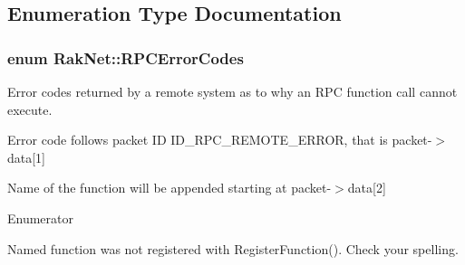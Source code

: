 \subsection{Enumeration Type Documentation}
\hypertarget{group___r_p_c___p_l_u_g_i_n___g_r_o_u_p_gac20c52e6dc585406689d52db29925bba}{
\subsubsection[{R\-P\-C\-Error\-Codes}]{\setlength{\rightskip}{0pt plus 5cm}enum {\bf Rak\-Net\-::\-R\-P\-C\-Error\-Codes}}}\label{group___r_p_c___p_l_u_g_i_n___g_r_o_u_p_gac20c52e6dc585406689d52db29925bba}


Error codes returned by a remote system as to why an R\-P\-C function call cannot execute. 

Error code follows packet I\-D I\-D\-\_\-\-R\-P\-C\-\_\-\-R\-E\-M\-O\-T\-E\-\_\-\-E\-R\-R\-O\-R, that is packet-\/$>$data\mbox{[}1\mbox{]}\par
 Name of the function will be appended starting at packet-\/$>$data\mbox{[}2\mbox{]} \begin{Desc}
\item[Enumerator]\par
\begin{description}
\item[{\em 
\hypertarget{group___r_p_c___p_l_u_g_i_n___g_r_o_u_p_ggac20c52e6dc585406689d52db29925bbaa832e0495ea50b9a373d201a3e28f086b}{R\-P\-C\-\_\-\-E\-R\-R\-O\-R\-\_\-\-F\-U\-N\-C\-T\-I\-O\-N\-\_\-\-N\-O\-T\-\_\-\-R\-E\-G\-I\-S\-T\-E\-R\-E\-D}\label{group___r_p_c___p_l_u_g_i_n___g_r_o_u_p_ggac20c52e6dc585406689d52db29925bbaa832e0495ea50b9a373d201a3e28f086b}
}]Named function was not registered with Register\-Function(). Check your spelling. \end{description}
\end{Desc}

